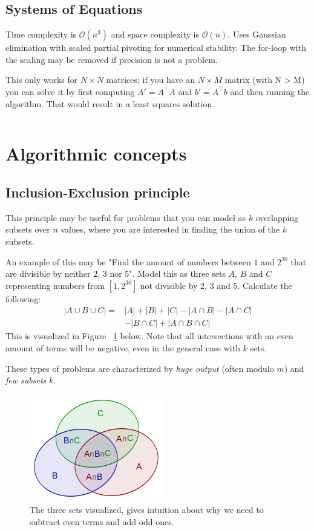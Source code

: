 \documentclass[8pt,a4paper,landscape,oneside]{amsart}
\newcommand{\code}[1]{\inputminted[fontsize=\normalsize,baselinestretch=1]{java}{code/#1}}
\newcommand{\bigO}{\mathcal{O}}
\begin{document}
\begin{multicols*}{3}
  \subsection{Systems of Equations}
  Time complexity is $\bigO(n^3)$ and space complexity is $\bigO(n)$. Uses Gaussian elimination with scaled partial pivoting for numerical stability. The for-loop with the scaling may be removed if precision is not a problem.
  
  This only works for $N \times N$ matrices; if you have an $N \times M$ matrix (with N > M) you can solve it by first computing $A' = A^\top A$ and $b' = A^\top b$ and then running the algorithm. That would result in a least squares solution.
  \code{Math/Gauss.java}
  


\section{Algorithmic concepts}
  \subsection{Inclusion-Exclusion principle}
  This principle may be useful for problems that you can model as $k$ overlapping subsets over $n$ values, where you are interested in finding the union of the $k$ subsets.
  
  An example of this may be "Find the amount of numbers between $1$ and $2^{30}$ that are divisible by neither 2, 3 nor 5". Model this as three sets $A$, $B$ and $C$ representing numbers from $[1, 2^{30}]$ not divisible by 2, 3 and 5. Calculate the following:
  \[
  \begin{split}
  |A \cup B \cup C| = & |A| + |B| + |C| - |A \cap B| - |A \cap C| \\
  & - |B \cap C| + |A \cap B \cap C|
  \end{split}
  \]
  This is visualized in Figure ~\ref{inclusion-exclusion} below. Note that all intersections with an even amount of terms will be negative, even in the general case with $k$ sets.
  
  These types of problems are characterized by \emph{huge output} (often modulo $m$) and \emph{few subsets} $k$.
  
  \begin{figure}[H]
  \centering
   \includegraphics[scale=0.5]{inclusion-exclusion_principle.png}
   \caption{The three sets visualized, gives intuition about why we need to subtract even terms and add odd ones.}
   \label{inclusion-exclusion}
  \end{figure}
  

\end{multicols*}
\end{document}
